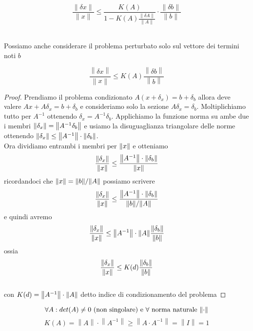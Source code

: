 \documentclass{article}
\begin{document}
\begin{mybox}[title=Condizionamento del problema con perturbazioni su $A$ e $b$]
  \begin{equation}
    \frac{\|\delta x\|}{\|x\|}\leq\frac{K(A)}{1-K(A)\frac{\|\delta A\|}{\|A\|}}\cdot\frac{\|\delta b\|}{\|b\|}
    \label{eq:condizionamento Ax=b}
  \end{equation}
\end{mybox}\\ 
Possiamo anche considerare il problema perturbato solo sul vettore dei termini noti $b$
\begin{mybox}[title=Condizionamento del problema con perturbazioni solo su $b$]
  \begin{equation}
  \frac{\left\|\delta x\right\|}{\left\|x\right\|}\leq K(A)\frac{\left\|\delta b\right\|}{\left\|b\right\|}
    \label{eq:}
  \end{equation}
\end{mybox}

\begin{proof} 
  Prendiamo il problema condizionato $A(x+\delta_{x}) = b + \delta_{b }$ allora deve valere $ Ax + A\delta_{x } = b + \delta_{b} $ e consideriamo solo la sezione $A \delta_{x } = \delta_{b}$. Moltiplichiamo tutto per $A ^ {-1  }$ ottenendo $\delta_{x } = A^{-1 }\delta_{b }$. Applichiamo la funzione norma su ambe due i membri 
$\norm{\delta_{x}}=\norm{A ^ {-1 } \delta_b}$ e usiamo la disuguaglianza triangolare delle norme ottenendo
$\norm{\delta_{x}} \leq \norm{A ^ {-1 }} \cdot \norm{\delta_b}$. \\ 
Ora dividiamo entrambi i membri per $\norm{x}$ e otteniamo $$\displaystyle\frac{\norm{\delta_{x }}}{\norm{x }} \leq \displaystyle\frac{\norm{A ^ {-1 }} \cdot \norm{\delta_{b }}}{\norm{x}}$$ 
ricordandoci che $\norm{x} = \norm{b}/\norm{A}$ possiamo scrivere 
$$\displaystyle\frac{\norm{\delta_{x }}}{\norm{x }} \leq \displaystyle\frac{\norm{A ^ {-1 }} \cdot \norm{\delta_{b }}}{\norm{b}/ \norm{A}}$$ e quindi avremo  
$$\displaystyle\frac{\norm{\delta_{x }}}{\norm{x }} \leq \norm{A ^ {-1 }} \cdot \norm{A} \displaystyle\frac{\norm{\delta_{b }}}{\norm{b}}$$ ossia $$\displaystyle\frac{\norm{\delta_{x }}}{\norm{x }} \leq K(d)\displaystyle\frac{\norm{\delta_{b }}}{\norm{b}}$$ \\
con $K(d) = \norm{A ^ {-1 }}\cdot \norm{A}$ detto indice di condizionamento del problema 
\end{proof}

\begin{theorem}
$$
\forall A : det(A) \neq 0 \text{ (non singolare)} \text{ e } \forall \text{ norma naturale }\norm{\cdot}
$$
$$
K(A)=\left\|A\right\|\cdot\left\|A^{-1}\right\|\geq\left\|A\cdot A^{-1}\right\|=\left\|I\right\|=1
$$
\end{theorem}
\end{document}
